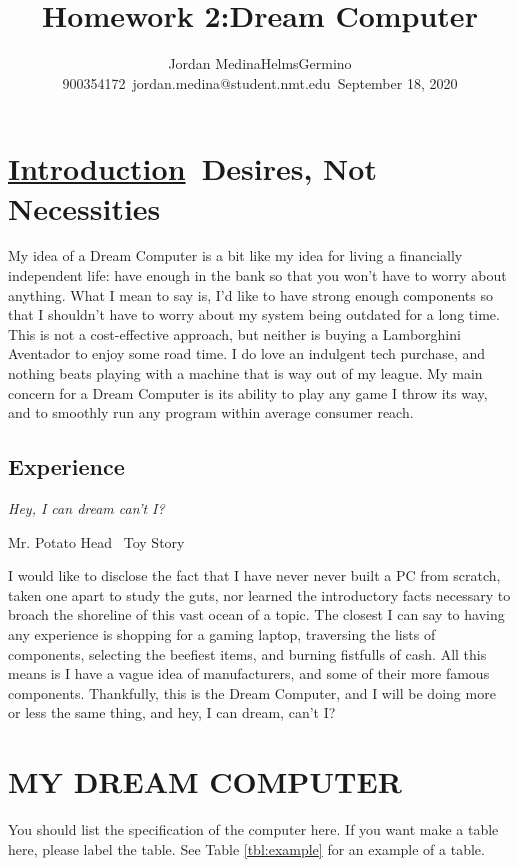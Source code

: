 \documentclass[letterpaper, 10 pt, conference]{IEEEconf}
\title{\LARGE \bf
Homework 2:\The Dream Computer
}
\author{Jordan Medina\Kenji Helms\Guillmer Germino
\small 900354172\
\small jordan.medina@student.nmt.edu\
\small {September 18, 2020}
}
\begin{document}
\maketitle




\section{\underline{Introduction}\ Desires, Not Necessities}

My idea of a Dream Computer is a bit like my idea for living a financially independent life: have enough in the bank so that you won't have to worry about anything. What I mean to say is, I'd like to have strong enough components so that I shouldn't have to worry about my system being outdated for a long time. This is not a cost-effective approach, but neither is buying a Lamborghini Aventador to enjoy some road time. I do love an indulgent tech purchase, and nothing beats playing with a machine that is way out of my league. My main concern for a Dream Computer is its ability to play any game I throw its way, and to smoothly run any program within average consumer reach.
\subsection{Experience}

\epigraph{\textit{Hey, I can dream can't I?}}{Mr. Potato Head \ Toy Story}
I would like to disclose the fact that I have never never built a PC from scratch, taken one apart to study the guts, nor learned the introductory facts necessary to broach the shoreline of this vast ocean of a topic. The closest I can say to having any experience is shopping for a gaming laptop, traversing the lists of components, selecting the beefiest items, and burning fistfulls of cash. All this means is I have a vague idea of manufacturers, and some of their more famous components. Thankfully, this is the Dream Computer, and I will be doing more or less the same thing, and hey, I can dream, can't I?

\section{MY DREAM COMPUTER}

You should list the specification of the computer here. If
you want make a table here, please label the table. See Table
\ref{tbl:example} for an example of a table.
\end{document}

